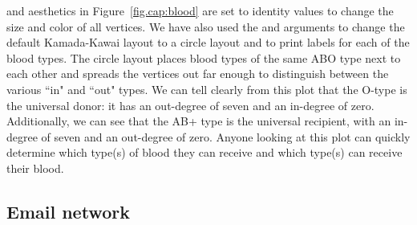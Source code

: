  and  aesthetics in Figure~\ref{fig.cap:blood} are set to identity values to change the size and color of all vertices. We have also used the  and  arguments to change the default Kamada-Kawai layout to a circle layout and to print labels for each of the blood types. The circle layout places blood types of the same ABO type next to each other and spreads the vertices out far enough to distinguish between the various ``in" and ``out" types.  We can tell clearly from this plot that the O-type is the universal donor: it has an out-degree of seven and an in-degree of zero. Additionally, we can see that the AB+ type is the universal recipient, with an in-degree of seven and an out-degree of zero. Anyone looking at this plot can quickly determine which type(s) of blood they can receive and which type(s) can receive their blood.

\subsection{Email network} 

